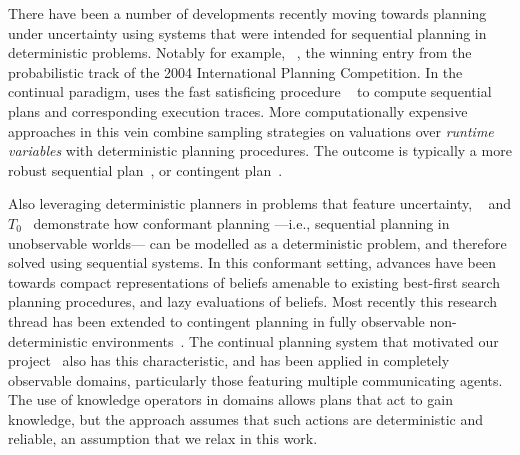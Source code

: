 There have been a number of developments recently moving towards
planning under uncertainty using systems that were intended for
sequential planning in deterministic problems.  Notably for example,
~\cite{yoon:etal:2007}, the winning entry from the
probabilistic track of the 2004 International Planning Competition.
In the continual paradigm,  uses the fast satisficing
procedure ~\cite{hoffmann:nebel:2001} to compute sequential
plans and corresponding execution traces.
More computationally expensive approaches in this vein combine
sampling strategies on valuations over {\em runtime variables} with
deterministic planning procedures. The outcome is typically a more
robust sequential plan~\cite{yoon:etal:2008}, or contingent
plan~\cite{majercik:2006}. 




Also leveraging deterministic planners in problems that feature
uncertainty, ~\cite{hoffmann:brafman:2006} and
$T_0$~\cite{palacios:geffner:2009} demonstrate how conformant planning
---i.e., sequential planning in unobservable worlds--- can be modelled
as a deterministic problem, and therefore solved using sequential
systems. In this conformant setting, advances have been towards
compact representations of beliefs amenable to existing best-first
search planning procedures, and lazy evaluations of beliefs. Most
recently this research thread has been extended to contingent planning
in fully observable non-deterministic
environments~\cite{albore:etal:2009}.
The continual planning system that motivated our
project~\cite{brenner:nebel:jaamas09} also has this characteristic,
and has been applied in completely observable domains, particularly
those featuring multiple communicating agents. The use of knowledge
operators in domains allows plans that act to gain knowledge, but the
approach assumes that such actions are deterministic and reliable, an
assumption that we relax in this work.

